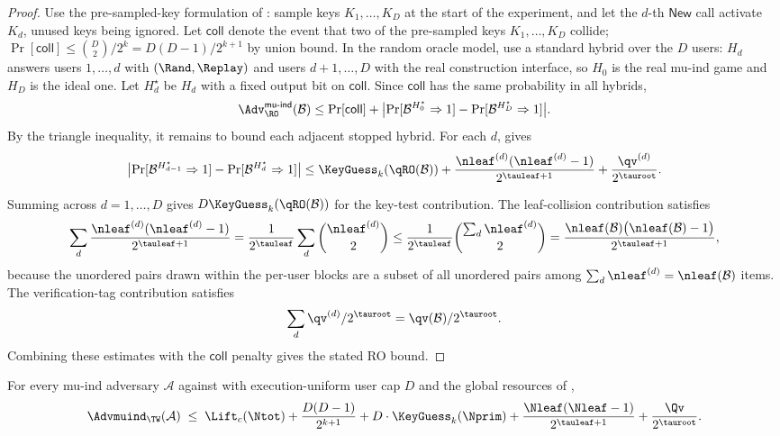 \begin{proof}
Use the pre-sampled-key formulation of : sample
keys $K_1,\dots,K_D$ at the start of the experiment, and let the $d$-th
$\mathsf{New}$ call activate $K_d$, unused keys being ignored.
Let $\mathsf{coll}$ denote the event that two of the pre-sampled keys
$K_1,\dots,K_D$ collide;
$\Pr[\mathsf{coll}] \leq \binom{D}{2}/2^k = D(D-1)/2^{k+1}$ by union
bound. In the random oracle model, use a standard hybrid over the $D$
users: $H_d$ answers users $1,\dots,d$ with $(\Rand,\Replay)$ and
users $d+1,\dots,D$ with the real construction interface, so $H_0$ is
the real mu-ind game and $H_D$ is the ideal one. Let $H_d^\star$ be
$H_d$ with a fixed output bit on $\mathsf{coll}$. Since
$\mathsf{coll}$ has the same probability in all hybrids,
\[
  \Adv^{\mathsf{mu\text{-}ind}}_{\RO}(\mathcal{B})
  \leq
  \Pr[\mathsf{coll}]
  +
  \bigl|\Pr[\mathcal{B}^{H_0^\star} \Rightarrow 1]
       - \Pr[\mathcal{B}^{H_D^\star} \Rightarrow 1]\bigr|.
\]
By the triangle inequality, it remains to bound each adjacent stopped
hybrid. For each $d$,  gives
\[
  \bigl|\Pr[\mathcal{B}^{H_{d-1}^\star} \Rightarrow 1]
       - \Pr[\mathcal{B}^{H_d^\star} \Rightarrow 1]\bigr|
  \leq
  \KeyGuess_k(\qRO(\mathcal{B}))
  + \frac{\nleaf^{(d)}(\nleaf^{(d)}-1)}{2^{\tauleaf+1}}
  + \frac{\qv^{(d)}}{2^{\tauroot}}.
\]

Summing across $d = 1,\dots,D$ gives
$D \KeyGuess_k(\qRO(\mathcal{B}))$ for the key-test contribution. The
leaf-collision contribution satisfies
\[
  \sum_d \frac{\nleaf^{(d)}(\nleaf^{(d)} - 1)}{2^{\tauleaf + 1}}
  = \frac{1}{2^{\tauleaf}} \sum_d \binom{\nleaf^{(d)}}{2}
  \leq \frac{1}{2^{\tauleaf}} \binom{\sum_d \nleaf^{(d)}}{2}
  = \frac{\nleaf(\mathcal{B})\bigl(\nleaf(\mathcal{B}) - 1\bigr)}
          {2^{\tauleaf + 1}},
\]
because the unordered pairs drawn within the per-user blocks are a
subset of all unordered pairs among $\sum_d \nleaf^{(d)} =
\nleaf(\mathcal{B})$ items. The verification-tag contribution satisfies
\[
  \sum_d \qv^{(d)} / 2^{\tauroot}
  = \qv(\mathcal{B}) / 2^{\tauroot}.
\]
Combining these estimates with the $\mathsf{coll}$ penalty gives the
stated RO bound.
\end{proof}

\begin{theorem}
\label{thm:mu-ind}
For every mu-ind adversary $\mathcal{A}$ against \TW{} with
execution-uniform user cap $D$ and the global resources of
,
\[
  \Advmuind_\TW(\mathcal{A})
  \;\leq\;
  \Lift_c(\Ntot)
  + \frac{D(D - 1)}{2^{k + 1}}
  + D \cdot \KeyGuess_k(\Nprim)
  + \frac{\Nleaf(\Nleaf - 1)}{2^{\tauleaf + 1}}
  + \frac{\Qv}{2^{\tauroot}}.
\]
\end{theorem}

